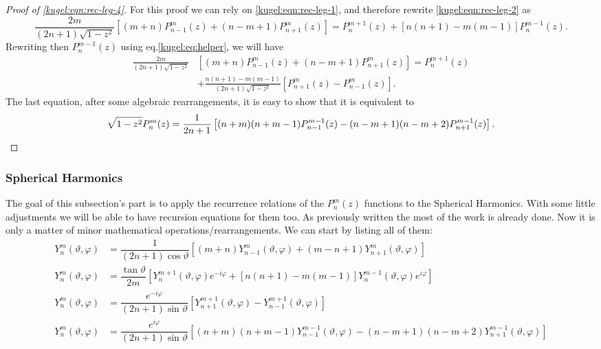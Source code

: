 \begin{proof}[Proof of \eqref{kugel:eqn:rec-leg-4}]
  For this proof we can rely on \eqref{kugel:eqn:rec-leg-1}, and therefore
  rewrite \eqref{kugel:eqn:rec-leg-2} as 
  \begin{equation*}
    \frac{2m}{(2n+1)\sqrt{1-z^2}} \left[
      (m+n)P^m_{n-1}(z) + (n-m+1)P^m_{n+1}(z)
    \right] = P^{m+1}_n(z) + [ n(n+1)-m(m-1) ]P^{m-1}_n(z).
  \end{equation*}
  Rewriting then $P^{m-1}_n(z)$ using eq.\eqref{kugel:eq:helper}, we will have
  \begin{align*}
    \frac{2m}{(2n+1)\sqrt{1-z^2}}
      &\left[ (m+n)P^m_{n-1}(z) + (n-m+1)P^m_{n+1}(z) \right] = P^{m+1}_n(z) \\
      &+ \frac{n(n+1)-m(m-1)}{(2n+1)\sqrt{1-z^2}} \left[
          P^m_{n+1}(z)-P^m_{n-1}(z)
        \right].
  \end{align*}
  The last equation, after some algebraic rearrangements, it is easy to show
  that it is equivalent to
  \begin{equation*}
    \sqrt{1-z^2} P^m_n(z) = \dfrac{1}{2n+1} \left[
      (n+m)(n+m-1)P^{m-1}_{n-1}(z) - (n-m+1)(n-m+2)P^{m-1}_{n+1}(z)
    \right].
    \qedhere
  \end{equation*}
\end{proof}

\subsubsection{Spherical Harmonics}

The goal of this subsection's part is to apply the recurrence relations of the
$P^m_n(z)$ functions to the Spherical Harmonics.  With some little adjustments
we will be able to have recursion equations for them too. As previously written
the most of the work is already done. Now it is only a matter of minor
mathematical operations/rearrangements. We can start by listing all of them:
\begin{subequations}
  \begin{align}
  Y^m_n(\vartheta, \varphi) &= \dfrac{1}{(2n+1)\cos \vartheta} \left[
      (m+n)Y^m_{n-1}(\vartheta, \varphi)
      + (m-n+1)Y^m_{n+1}(\vartheta, \varphi)
    \right] \label{kugel:eqn:rec-sph-harm-1} \\
  Y^m_n(\vartheta, \varphi) &= \dfrac{\tan \vartheta}{2m}\left[
      Y^{m+1}_n(\vartheta, \varphi)e^{-i\varphi}
      + [n(n+1)-m(m-1)]Y^{m-1}_n(\vartheta, \varphi)e^{i\varphi}
    \right] \label{kugel:eqn:rec-sph-harm-2} \\
  Y^m_n(\vartheta, \varphi) &= \dfrac{e^{-i\varphi}}{ (2n+1)\sin \vartheta}
    \left[
      Y^{m+1}_{n+1}(\vartheta, \varphi)
      - Y^{m+1}_{n-1}(\vartheta, \varphi)
    \right] \label{kugel:eqn:rec-sph-harm-3} \\
  Y^m_n(\vartheta, \varphi) &= \dfrac{e^{i\varphi}}{(2n+1)\sin \vartheta}
    \left[
      (n+m)(n+m-1)Y^{m-1}_{n-1}(\vartheta, \varphi)
      - (n-m+1)(n-m+2)Y^{m-1}_{n+1}(\vartheta, \varphi)
    \right] \label{kugel:eqn:rec-sph-harm-4} 
  \end{align}
\end{subequations}

